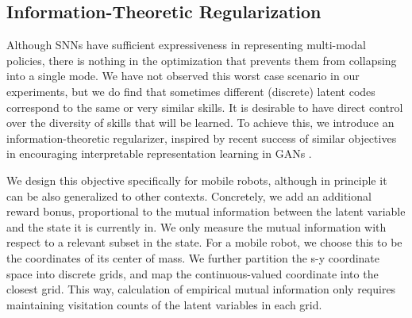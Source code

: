 \documentclass{article} %
\begin{document}





\subsection{Information-Theoretic Regularization}
\label{section:method:inforeg}

Although SNNs have sufficient expressiveness in representing multi-modal policies, there is nothing in the optimization that prevents them from collapsing into a single mode. We have not observed this worst case scenario in our experiments, but we do find that sometimes different (discrete) latent codes correspond to the same or very similar skills. It is desirable to have direct control over the diversity of skills that will be learned. To achieve this, we introduce an information-theoretic regularizer, inspired by recent success of similar objectives in encouraging interpretable representation learning in GANs \citep{chen2016infogan}.

We design this objective specifically for mobile robots, although in principle it can be also generalized to other contexts.
Concretely, we add an additional reward bonus, proportional to the mutual information between the latent variable and the state it is currently in. We only measure the mutual information with respect to a relevant subset in the state. For a mobile robot, we choose this to be the coordinates of its center of mass. We further partition the s-y coordinate space into discrete grids, and map the continuous-valued coordinate into the closest grid. This way, calculation of empirical mutual information only requires maintaining visitation counts of the latent variables in each grid.
\end{document}
